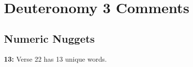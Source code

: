 \section{Deuteronomy 3 Comments}

\subsection{Numeric Nuggets}
\textbf{13: } Verse 22 has 13 unique words.